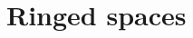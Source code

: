 \documentclass[../../../main]{subfiles}
\begin{document}
\chapter{Ringed spaces}




\end{document}
